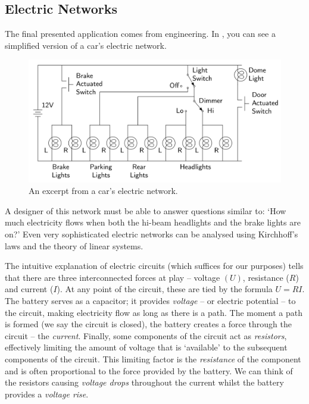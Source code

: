 \subsection{Electric Networks}
\label{ssec:electric-networks}

The final presented application comes from engineering. In
, you can see a simplified version of a car's
electric network.

\begin{figure}[ht]
 \centering
 \includegraphics[width=.8\textwidth]{figs/car-circuit}
 \caption{An excerpt from a car's electric network.}
 \label{fig:car-circuit}
\end{figure}

A designer of this network must be able to answer questions similar to: `How
much electricity flows when both the hi-beam headlights and the brake lights are
on?' Even very sophisticated electric networks can be analysed using Kirchhoff's
laws and the theory of linear systems.

The intuitive explanation of electric circuits (which suffices for our purposes)
tells that there are three interconnected forces at play -- voltage $(U)$,
resistance ($R$) and current ($I$). At any point of the circuit, these are tied
by the formula $U = RI$. The battery serves as a capacitor; it provides
\emph{voltage} -- or electric potential -- to the circuit, making electricity
flow as long as there is a path. The moment a path is formed (we say the circuit
is closed), the battery creates a force through the circuit -- the
\emph{current}. Finally, some components of the circuit act as \emph{resistors},
effectively limiting the amount of voltage that is `available' to the subsequent
components of the circuit. This limiting factor is the \emph{resistance} of the
component and is often proportional to the force provided by the battery. We can
think of the resistors causing \emph{voltage drops} throughout the current
whilst the battery provides a \emph{voltage rise}.

